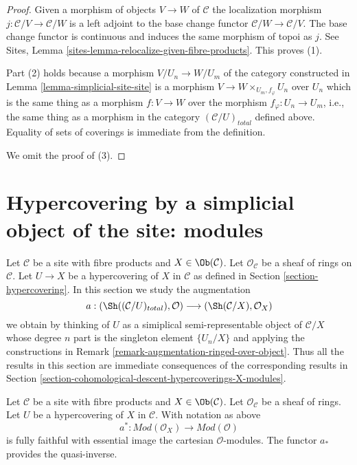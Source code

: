 \begin{proof}
Given a morphism of objects $V \to W$ of $\mathcal{C}$ the localization
morphism $j : \mathcal{C}/V \to \mathcal{C}/W$ is a left adjoint to
the base change functor $\mathcal{C}/W \to \mathcal{C}/V$.
The base change functor is continuous and induces the same morphism of
topoi as $j$. See
Sites, Lemma \ref{sites-lemma-relocalize-given-fibre-products}.
This proves (1).

\medskip\noindent
Part (2) holds because a morphism $V/U_n \to W/U_m$
of the category constructed
in Lemma \ref{lemma-simplicial-site-site}
is a morphism $V \to W \times_{U_m, f_\varphi} U_n$ over $U_n$
which is the same thing as a morphism $f : V \to W$
over the morphism $f_\varphi : U_n \to U_m$, i.e.,
the same thing as a morphism in the category $(\mathcal{C}/U)_{total}$
defined above. Equality of sets of coverings is
immediate from the definition.

\medskip\noindent
We omit the proof of (3).
\end{proof}







\section{Hypercovering by a simplicial object of the site: modules}
\label{section-hypercovering-modules}

\noindent
Let $\mathcal{C}$ be a site with fibre products and $X \in \Ob(\mathcal{C})$.
Let $\mathcal{O}_\mathcal{C}$ be a sheaf of rings on $\mathcal{C}$.
Let $U \to X$ be a hypercovering of $X$ in $\mathcal{C}$ as defined
in Section \ref{section-hypercovering}. In this section we study the
augmentation
$$
a :
(\Sh((\mathcal{C}/U)_{total}), \mathcal{O})
\longrightarrow
(\Sh(\mathcal{C}/X), \mathcal{O}_X)
$$
we obtain by thinking of $U$ as a simiplical semi-representable
object of $\mathcal{C}/X$ whose degree $n$ part is the singleton
element $\{U_n/X\}$ and applying the constructions in
Remark \ref{remark-augmentation-ringed-over-object}.
Thus all the results in this section are immediate consequences
of the corresponding results in
Section \ref{section-cohomological-descent-hypercoverings-X-modules}.

\begin{lemma}
\label{lemma-hypercovering-X-simple-descent-modules}
Let $\mathcal{C}$ be a site with fibre products and $X \in \Ob(\mathcal{C})$.
Let $\mathcal{O}_\mathcal{C}$ be a sheaf of rings.
Let $U$ be a hypercovering of $X$ in $\mathcal{C}$. With notation as above
$$
a^* : \textit{Mod}(\mathcal{O}_X) \to \textit{Mod}(\mathcal{O})
$$
is fully faithful with essential image the cartesian $\mathcal{O}$-modules.
The functor $a_*$ provides the quasi-inverse.
\end{lemma}

